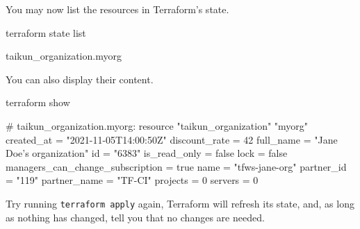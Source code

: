 You may now list the resources in Terraform's state.
\begin{shell}
terraform state list
\end{shell}
\begin{raw}
taikun_organization.myorg
\end{raw}
You can also display their content.
\begin{shell}
terraform show
\end{shell}
\begin{raw}
# taikun_organization.myorg:
resource "taikun_organization" "myorg" {
    created_at                       = "2021-11-05T14:00:50Z"
    discount_rate                    = 42
    full_name                        = "Jane Doe's organization"
    id                               = "6383"
    is_read_only                     = false
    lock                             = false
    managers_can_change_subscription = true
    name                             = "tfws-jane-org"
    partner_id                       = "119"
    partner_name                     = "TF-CI"
    projects                         = 0
    servers                          = 0
}
\end{raw}
\begin{info}
Try running \texttt{terraform apply} again, Terraform will refresh its state, and, as long as
nothing has changed, tell you that no changes are needed.
\end{info}
